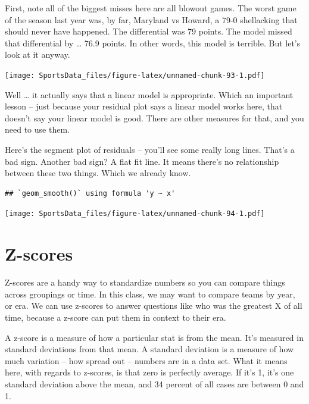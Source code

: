 \documentclass[
]{book}
\begin{document}
First, note all of the biggest misses here are all blowout games. The worst game of the season last year was, by far, Maryland vs Howard, a 79-0 shellacking that should never have happened. The differential was 79 points. The model missed that differential by \ldots{} 76.9 points. In other words, this model is terrible. But let's look at it anyway.

\texttt{[image: SportsData\_files/figure-latex/unnamed-chunk-93-1.pdf]}

Well \ldots{} it actually says that a linear model is appropriate. Which an important lesson -- just because your residual plot says a linear model works here, that doesn't say your linear model is good. There are other measures for that, and you need to use them.

Here's the segment plot of residuals -- you'll see some really long lines. That's a bad sign. Another bad sign? A flat fit line. It means there's no relationship between these two things. Which we already know.

\begin{verbatim}
## `geom_smooth()` using formula 'y ~ x'
\end{verbatim}

\texttt{[image: SportsData\_files/figure-latex/unnamed-chunk-94-1.pdf]}

\hypertarget{z-scores}{%
\chapter{Z-scores}\label{z-scores}}

Z-scores are a handy way to standardize numbers so you can compare things across groupings or time. In this class, we may want to compare teams by year, or era. We can use z-scores to answer questions like who was the greatest X of all time, because a z-score can put them in context to their era.

A z-score is a measure of how a particular stat is from the mean. It's measured in standard deviations from that mean. A standard deviation is a measure of how much variation -- how spread out -- numbers are in a data set. What it means here, with regards to z-scores, is that zero is perfectly average. If it's 1, it's one standard deviation above the mean, and 34 percent of all cases are between 0 and 1.
\end{document}
